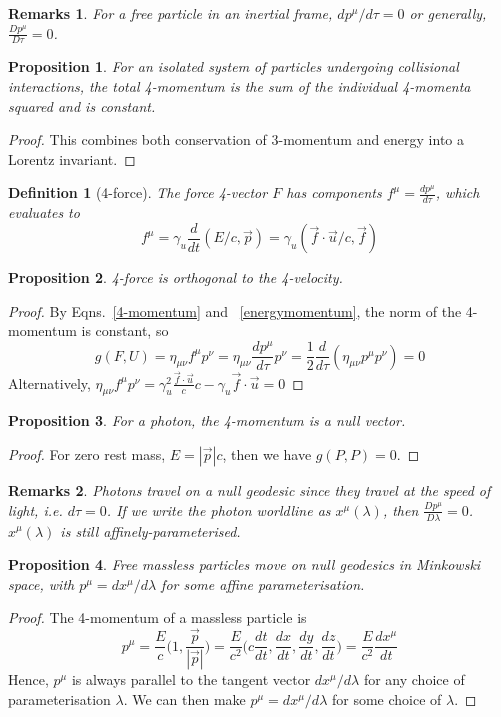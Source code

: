 \documentclass[a4paper]{article}
\newtheorem{remarks}{Remarks}[section]
\theoremstyle{new}
\newtheorem{defi}{Definition}[section]
\newtheorem{prop}{Proposition}[section]
\begin{document}
\begin{remarks}
For a free particle in an inertial frame, $dp^\mu/d\tau=0$ or generally, $\frac{Dp^\mu}{D\tau}=0$.
\end{remarks}
\begin{prop}
For an isolated system of particles undergoing collisional interactions, the total 4-momentum is the sum of the individual 4-momenta squared and is constant.
\end{prop}
\begin{proof}
This combines both conservation of 3-momentum and energy into a Lorentz invariant.
\end{proof}
\begin{defi}[4-force]
The force 4-vector $F$ has components $f^\mu=\frac{dp^\mu}{d\tau}$, which evaluates to
\begin{equation}
    f^\mu=\gamma_u\frac{d}{dt}(E/c,\vec{p})=\gamma_u(\vec{f}\cdot\vec{u}/c,\vec{f})\label{4-force}
\end{equation}
\end{defi}
\begin{prop}
4-force is orthogonal to the 4-velocity.
\end{prop}
\begin{proof}
By Eqns.~\ref{4-momentum} and ~\ref{energymomentum}, the norm of the 4-momentum is constant, so 
$$g(F,U)=\eta_{\mu\nu}f^\mu p^\nu=\eta_{\mu\nu}\frac{dp^\mu}{d\tau}p^\nu=\frac{1}{2}\frac{d}{d\tau}(\eta_{\mu\nu}p^\mu p^\nu)=0$$
Alternatively, $\eta_{\mu\nu}f^\mu p^\nu=\gamma_u^2\frac{\vec{f}\cdot\vec{u}}{c}c-\gamma_u\vec{f}\cdot\vec{u}=0$
\end{proof}
\begin{prop}
For a photon, the 4-momentum is a null vector.
\end{prop}
\begin{proof}
For zero rest mass, $E=|\vec{p}|c$, then we have $g(P,P)=0$.
\end{proof}
\begin{remarks}
Photons travel on a null geodesic since they travel at the speed of light, i.e. $d\tau=0$. If we write the photon worldline as $x^\mu(\lambda)$, then $\frac{Dp^\mu}{D\lambda}=0$. $x^\mu(\lambda)$ is still affinely-parameterised.
\end{remarks}
\begin{prop}
Free massless particles move on null geodesics in Minkowski space, with $p^\mu=dx^\mu/d\lambda$ for some affine parameterisation.
\end{prop}
\begin{proof}
The 4-momentum of a massless particle is
$$p^\mu=\frac{E}{c}\bigg(1,\frac{\vec{p}}{|\vec{p}|}\bigg)=\frac{E}{c^2}\bigg(c\frac{dt}{dt},\frac{dx}{dt},\frac{dy}{dt},\frac{dz}{dt}\bigg)=\frac{E}{c^2}\frac{dx^\mu}{dt}$$
Hence, $p^\mu$ is always parallel to the tangent vector $dx^\mu/d\lambda$ for any choice of parameterisation $\lambda$. We can then make $p^\mu=dx^\mu/d\lambda$ for some choice of $\lambda$.
\end{proof}
\end{document}
